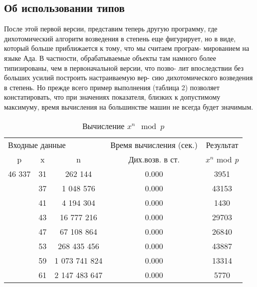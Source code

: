 \subsection{Об использовании типов}

\noindent После этой первой версии, представим теперь другую программу, где\linebreak
дихотомический алгоритм возведения в степень еще фигурирует, но в\linebreak
виде, который больше приближается к тому, что мы считаем програм­-\linebreak
мированием на языке Ада. В частности, обрабатываемые объекты там\linebreak
намного более типизированы, чем в первоначальной версии, что позво­-\linebreak
лит впоследствии без больших усилий построить настраиваемую вер­-\linebreak
сию дихотомического возведения в степень. Но прежде всего пример\linebreak
выполнения (таблица 2) позволяет констатировать, что при значениях\linebreak
показателя, близких к допустимому максимуму, время вычисления на\linebreak
большинстве машин не всегда будет значимым.
\begin{table}
\centering
\begin{tabular}{|*{5}{c|}}
\hline 
 \multicolumn{3}{|l|}{Входные данные} & {Время вычисления (сек.)} & Результат\\
p & x & n &  Дих.возв. в ст. & $x^n$ mod {\it p}\\ 
\hline
46 337  & 31 & 262 144 & 0.000 & 3951\\
 & 37 & 1 048 576&  0.000 & 43153\\
 & 41 & 4 194 304  & 0.000 & 1430\\
 & 43 & 16 777 216 &  0.000 & 29703\\
 & 47 & 67 108 864  & 0.000 & 26840\\
 & 53 & 268 435 456  & 0.000 & 43887\\
 & 59 & 1 073 741 824 & 0.000 & 13314\\
 & 61 & 2 147 483 647 & 0.000 & 5770\\
\hline
\end{tabular}
\caption{ Вычисление ${x^n}\mod{p}$}
\end{table}

